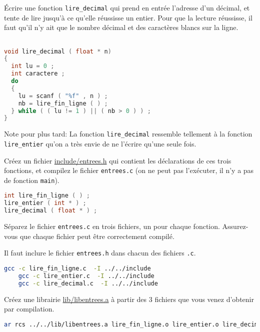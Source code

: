 \question Écrire une fonction \texttt{lire\_decimal} qui prend en
entrée l'adresse d'un décimal, et tente de lire jusqu'à ce qu'elle
réussisse un entier. Pour que la lecture réussisse, il faut qu'il n'y
ait que le nombre décimal et des caractères blancs sur la ligne.

\begin{solution}
  \begin{lstlisting}[language=C]

void lire_decimal ( float * n) 
{
  int lu = 0 ;
  int caractere ;
  do
  {
    lu = scanf ( "%f" , n ) ;
    nb = lire_fin_ligne ( ) ;
  } while ( ( lu != 1 ) || ( nb > 0 ) ) ;
}
  \end{lstlisting}
  Note pour plus tard: La fonction \texttt{lire\_decimal} ressemble
  tellement à la fonction \texttt{lire\_entier} qu'on a très envie de ne l'écrire 
  qu'une seule fois.
\end{solution}

\question Créez un fichier \url{include/entrees.h} qui contient les
déclarations de ces trois fonctions, et compilez le fichier
\texttt{entrees.c} (on ne peut pas l'exécuter, il n'y a pas de
fonction \texttt{main}).

\begin{solution}
  \begin{lstlisting}[language=C]
int lire_fin_ligne ( ) ;
lire_entier ( int * ) ;  
lire_decimal ( float * ) ;     
  \end{lstlisting}
\end{solution}
\question Séparez le fichier \texttt{entrees.c} en trois fichiers, un
pour chaque fonction. Assurez-vous que chaque fichier peut être
correctement compilé.

\begin{solution}
  Il faut inclure le fichier \texttt{entrees.h} dans chacun des
  fichiers \texttt{.c}.
  \begin{lstlisting}[language=bash]
    gcc -c lire_fin_ligne.c  -I ../../include
    gcc -c lire_entier.c  -I ../../include
    gcc -c lire_decimal.c  -I ../../include
  \end{lstlisting}
\end{solution}

\question Créez une librairie \url{lib/libentrees.a} à partir des 3
fichiers que vous venez d'obtenir par compilation.

\begin{solution}
  \begin{lstlisting}[language=bash]
    ar rcs ../../lib/libentrees.a lire_fin_ligne.o lire_entier.o lire_decimal.o
  \end{lstlisting}
\end{solution}

